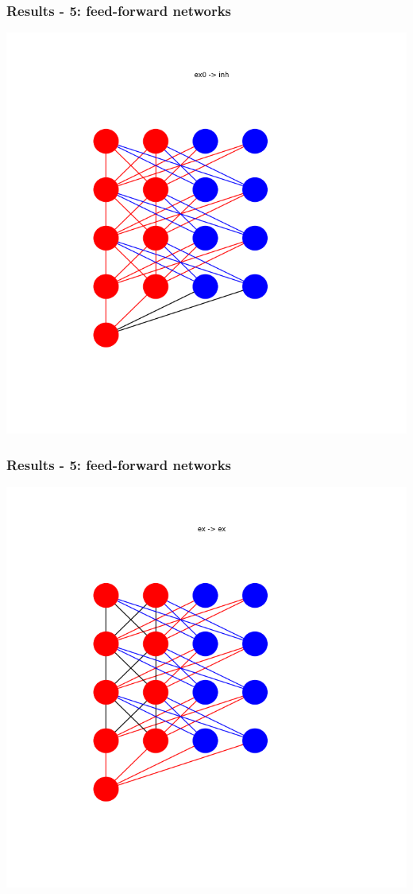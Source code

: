 \documentclass{beamer}
\begin{document}
\begin{frame}
    \frametitle{Results - 5: feed-forward networks}
    \includegraphics[width=\textwidth]{figures/ex0_inh.png}
\end{frame}

\begin{frame}
    \frametitle{Results - 5: feed-forward networks}
    \includegraphics[width=\textwidth]{figures/ex_ex.png}
\end{frame}
\end{document}

